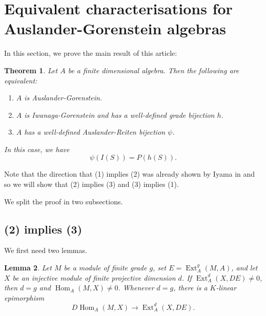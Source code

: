 \documentclass[a4paper]{amsart}
\newtheorem{theorem}{Theorem}[section]
\newtheorem{lemma}[theorem]{Lemma}
\theoremstyle{definition}
\theoremstyle{remark}
\numberwithin{equation}{section}
\newcommand{\Ext}{\operatorname{Ext}}
\newcommand{\Hom}{\operatorname{Hom}}
\begin{document}
\section{Equivalent characterisations for Auslander-Gorenstein algebras}
In this section, we prove the main result of this article:
\begin{theorem} \label{thm:mainresult}
Let $A$ be a finite dimensional algebra. Then the following are equivalent:
\begin{enumerate}
    \item $A$ is Auslander-Gorenstein.
    \item $A$ is Iwanaga-Gorenstein and has a well-defined grade bijection $h$.
    \item $A$ has a well-defined Auslander-Reiten bijection $\psi$.
\end{enumerate}
In this case, we have 
\begin{equation*}
 \psi(I(S))=P(h(S)).
\end{equation*}
\end{theorem}

Note that the direction that (1) implies (2) was already shown by Iyama in \cite{I2} and so we will show that (2) implies (3) and (3) implies (1).

We split the proof in two subsections. 
\subsection{(2) implies (3)}

We first need two lemmas.

\begin{lemma}\label{lem:endpoint-evaluation}
Let $M$ be a module of finite grade $g$, set $E=\Ext_A^g(M,A)$, and let $X$ be an injective module of finite projective dimension $d$. If $\Ext_A^d(X,DE)\neq 0$, then $d=g$ and $\Hom_A(M,X)\neq 0$. Whenever $d=g$, there is a $K$-linear epimorphism
\[
 D\Hom_A(M,X)\longrightarrow\Ext_A^d(X,DE).
\]
\end{lemma}
\end{document}
